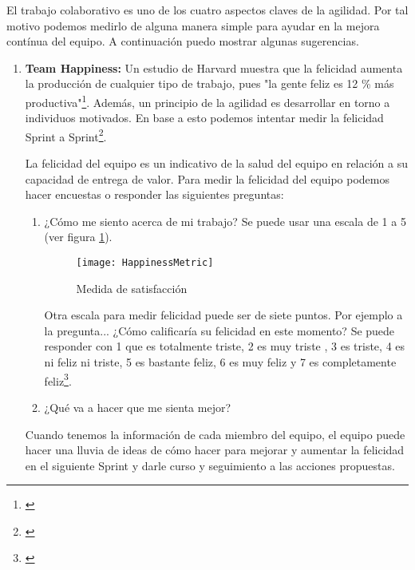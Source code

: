 El trabajo colaborativo es uno de los cuatro aspectos claves de la agilidad. Por tal motivo podemos medirlo de alguna manera simple para ayudar en la mejora contínua del equipo. A continuación puedo mostrar algunas sugerencias.

\begin{enumerate}

\item {\textbf{Team Happiness:} Un estudio de Harvard muestra que la felicidad aumenta la producción de cualquier tipo de trabajo, pues "la gente feliz es 12 \% más productiva"\footnote{\cite{U-K-University-2014}}. Además, un principio de la agilidad es desarrollar en torno a individuos motivados. En base a esto podemos intentar medir la felicidad Sprint a Sprint\footnote{\cite{Jeff-2014}}. 

La felicidad del equipo es un indicativo de la salud del equipo en relación a su capacidad de entrega de valor. Para medir la felicidad del equipo podemos hacer encuestas o responder las siguientes preguntas:

  \begin{enumerate}
  \item {¿Cómo me siento acerca de mi trabajo? Se puede usar una escala de 1 a 5 (ver figura \ref{fig:HappinessMetric}). 
  
  \begin{figure}[h]
  \centering
  \texttt{[image: HappinessMetric]}
  \caption{Medida de satisfacción}
  \centering
  \label{fig:HappinessMetric} %
  \end{figure}
  \FloatBarrier

  Otra escala para medir felicidad puede ser de siete puntos. Por ejemplo a la pregunta... ¿Cómo calificaría su felicidad en este momento? Se puede responder con 1 que es totalmente triste, 2 es muy triste , 3 es triste, 4 es ni feliz ni triste, 5 es bastante feliz, 6 es muy feliz y 7 es completamente feliz\footnote{\cite{U-K-University-2014}}.
  }
  
  \item {¿Qué va a hacer que me sienta mejor?}
  \end{enumerate}

Cuando tenemos la información de cada miembro del equipo, el equipo puede hacer una lluvia de ideas de cómo hacer para mejorar y aumentar la felicidad en el siguiente Sprint y darle curso y seguimiento a las acciones propuestas.

}


\end{enumerate}
